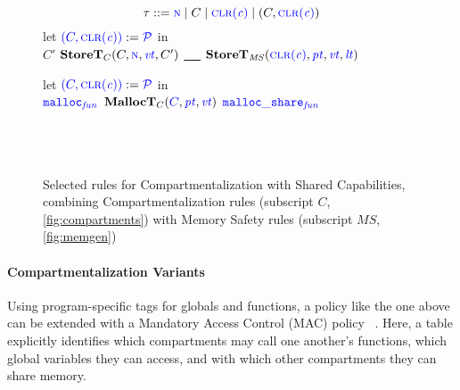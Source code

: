 \documentclass{llncs}
\begin{document}
\begin{figure}[t]
  \scriptsize  
  \color{blue}
  \begin{minipage}{0.4\textwidth}
    \center
    \[\tau ::= \N \mid C \mid \clr \mid (C,\clr)\]
    \storetruleblock
        {let  \({\color{blue}(C,\clr)} := \PCT\) in \\
          \caseoftwo{\(\lt\)}
                    {\color{blue} \(C'\)}{\color{blue} \(\mathbf{StoreT}_C(C,\N,\vt,C')\)}
                    {\underline{~ ~}}{\color{blue} \(\mathbf{StoreT}_{\mathit{MS}}(\clr,\pt,\vt,\lt)\)}}
  \end{minipage}
  \begin{minipage}{0.59\textwidth}
    \scriptsize
    \malloctruleblock
      {let \({\color{blue} (C,\clr)} := \PCT\) in \\
        \caseoftwo{\(\pt\)}
                  {\(\FN[malloc]\)}{\color{blue} \(\mathbf{MallocT}_{C}({\color{blue} C},\pt,\vt)\)}
                  {\(\FN[malloc\_share]\)}
                  {\\ \\
                     \\
                     \\}
      }
  \end{minipage}
  
  \caption{Selected rules for Compartmentalization with Shared Capabilities, combining Compartmentalization rules (subscript \(C\), \cref{fig:compartments}) with Memory Safety rules (subscript \(\mathit{MS}\), \cref{fig:memgen})}
  \label{fig:sharing}
\end{figure}

\paragraph*{Compartmentalization Variants}

Using program-specific tags for globals and functions, a policy
like the one above can be extended with a Mandatory Access Control (MAC) policy
~\cite{Lampson74:Protection}.
Here, a table explicitly identifies which compartments may call one another's functions,
which global variables they can access, and with which other compartments they can share
memory.
\end{document}

